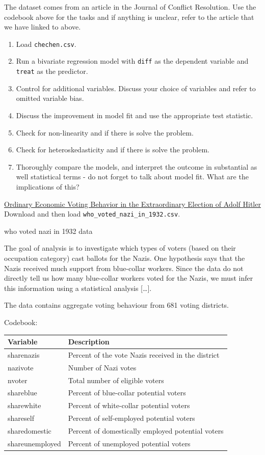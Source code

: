 \documentclass[]{article}
\providecommand{\tightlist}{%
  \setlength{\itemsep}{0pt}\setlength{\parskip}{0pt}}
\theoremstyle{definition}
\theoremstyle{definition}
\theoremstyle{definition}
\theoremstyle{remark}
\begin{document}
The dataset comes from an article in the Journal of Conflict Resolution.
Use the codebook above for the tasks and if anything is unclear, refer
to the article that we have linked to above.

\begin{enumerate}
\def\labelenumi{\arabic{enumi}.}
\tightlist
\item
  Load \texttt{chechen.csv}.
\item
  Run a bivariate regression model with \texttt{diff} as the dependent
  variable and \texttt{treat} as the predictor.
\item
  Control for additional variables. Discuss your choice of variables and
  refer to omitted variable bias.
\item
  Discuss the improvement in model fit and use the appropriate test
  statistic.
\item
  Check for non-linearity and if there is solve the problem.
\item
  Check for heteroskedasticity and if there is solve the problem.
\item
  Thoroughly compare the models, and interpret the outcome in
  substantial as well statistical terms - do not forget to talk about
  model fit. What are the implications of this?
\end{enumerate}

\href{https://www.cambridge.org/core/journals/journal-of-economic-history/article/ordinary-economic-voting-behavior-in-the-extraordinary-election-of-adolf-hitler/8C79A0AB9DA174B7D81A6EB313B1EDFC}{Ordinary
Economic Voting Behavior in the Extraordinary Election of Adolf Hitler}
Download and then load \texttt{who\_voted\_nazi\_in\_1932.csv}.

who voted nazi in 1932 data

The goal of analysis is to investigate which types of voters (based on
their occupation category) cast ballots for the Nazis. One hypothesis
says that the Nazis received much support from blue-collar workers.
Since the data do not directly tell us how many blue-collar workers
voted for the Nazis, we must infer this information using a statistical
analysis {[}\ldots{}{]}.

The data contains aggregate voting behaviour from 681 voting districts.

 Codebook:

\begin{longtable}[]{@{}ll@{}}
\toprule
Variable & Description\tabularnewline
\midrule
\endhead
sharenazis & Percent of the vote Nazis received in the
district\tabularnewline
nazivote & Number of Nazi votes\tabularnewline
nvoter & Total number of eligible voters\tabularnewline
shareblue & Percent of blue-collar potential voters\tabularnewline
sharewhite & Percent of white-collar potential voters\tabularnewline
shareself & Percent of self-employed potential voters\tabularnewline
sharedomestic & Percent of domestically employed potential
voters\tabularnewline
shareunemployed & Percent of unemployed potential voters\tabularnewline
\bottomrule
\end{longtable}
\end{document}

